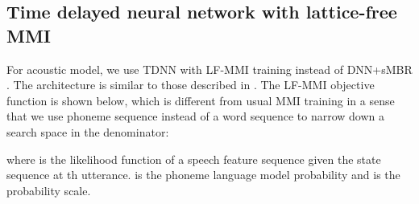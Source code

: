 \documentclass[a4paper]{article}
\begin{document}
\begin{table*}[tbh]
  \caption{Speech Enhancement Scores}
  \label{tab:se_scores}
  \centering
\end{table*}

\subsection{Time delayed neural network with lattice-free MMI}
\label{sec:tdnn}
For acoustic model, we use TDNN with LF-MMI training \cite{povey2016purely} instead of DNN+sMBR \cite{vesely2013sequence}. 
The architecture is similar to those described in \cite{peddinti2015time}. 
The LF-MMI objective function is shown below, which is different from usual MMI training \cite{povey2005discriminative} in a sense that we use phoneme sequence  instead of a word sequence to narrow down a search space in the denominator:

where  is the likelihood function of a speech feature sequence  given the state sequence  at \textquotesingle th utterance. 
 is the phoneme language model probability and  is the probability scale.
\end{document}
